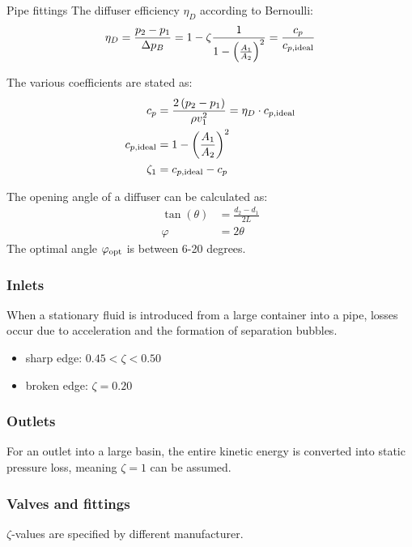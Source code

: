 \documentclass{article}
\begin{document}
\newpage
\begin{multicols}{2}
\setlength{\columnsep}{1pt}
\begin{theorybox}{Pipe fittings}
    The diffuser efficiency $\eta_D$ according to Bernoulli:
    \begin{equation}
        \eta_D = \frac{p_2 - p_1}{\Delta p_B} = 1 - \zeta \frac{1}{1 - \left(\frac{A_1}{A_2}\right)^2} = \frac{c_p}{c_{p,\rm ideal}}
    \end{equation}

    The various coefficients are stated as:
    \begin{align}
        c_p &= \frac{2\left(p_2 - p_1\right)}{\rho v_1^2} = \eta_D \cdot c_{p,\rm ideal}\\
        c_{p,\rm ideal} &= 1 - \left(\frac{A_1}{A_2}\right)^2\\
        \zeta_1 &= c_{p,\rm ideal} - c_p
    \end{align}

    The opening angle of a diffuser can be calculated as:
    \begin{align}
        \tan(\theta) &= \frac{d_2 - d_1}{2L}\\
        \varphi &= 2\theta
    \end{align}
    The optimal angle $\varphi_{\rm opt}$ is between 6-20 degrees.

    \subsubsection{Inlets}
    When a stationary fluid is introduced from a large container into a
    pipe, losses occur due to acceleration and the formation of
    separation bubbles.
    \begin{itemize}
        \item sharp edge: $0.45 < \zeta < 0.50$
        \item broken edge: $\zeta = 0.20$
    \end{itemize}

    \subsubsection{Outlets}
    For an outlet into a large basin, the entire kinetic energy is
    converted into static pressure loss, meaning $\zeta = 1$ can be assumed.

    \subsubsection{Valves and fittings}
    $\zeta$-values are specified by different manufacturer.
\end{theorybox}


\end{multicols}
\end{document}

